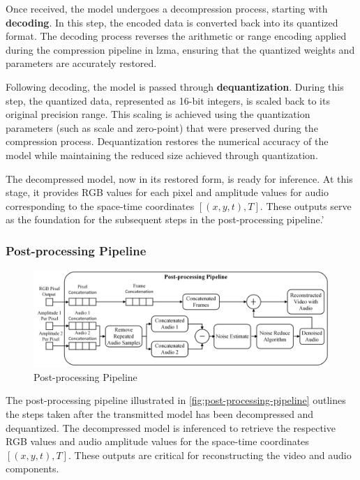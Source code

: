         Once received, the model undergoes a decompression process, starting with \textbf{decoding}. In this step, the encoded data is converted back into its quantized format. The decoding process reverses the arithmetic or range encoding applied during the compression pipeline in \gls{lzma}, ensuring that the quantized weights and parameters are accurately restored.

        Following decoding, the model is passed through \textbf{dequantization}. During this step, the quantized data, represented as 16-bit integers, is scaled back to its original precision range. This scaling is achieved using the quantization parameters (such as scale and zero-point) that were preserved during the compression process. Dequantization restores the numerical accuracy of the model while maintaining the reduced size achieved through quantization.

        The decompressed model, now in its restored form, is ready for inference. At this stage, it provides RGB values for each pixel and amplitude values for audio corresponding to the space-time coordinates $\left[(x, y, t), T\right]$. These outputs serve as the foundation for the subsequent steps in the post-processing pipeline.'

        \subsubsection{Post-processing Pipeline}
        \begin{figure}[H]
            \centering
            \includegraphics[width=0.9\linewidth]{assets/Major Data Post-Processing.png}
            \caption{Post-processing Pipeline}
            \label{fig:post-processing-pipeline}
        \end{figure}
        The post-processing pipeline illustrated in \autoref{fig:post-processing-pipeline} outlines the steps taken after the transmitted model has been decompressed and dequantized. The decompressed model is inferenced to retrieve the respective RGB values and audio amplitude values for the space-time coordinates $\left[(x, y, t), T\right]$. These outputs are critical for reconstructing the video and audio components.

